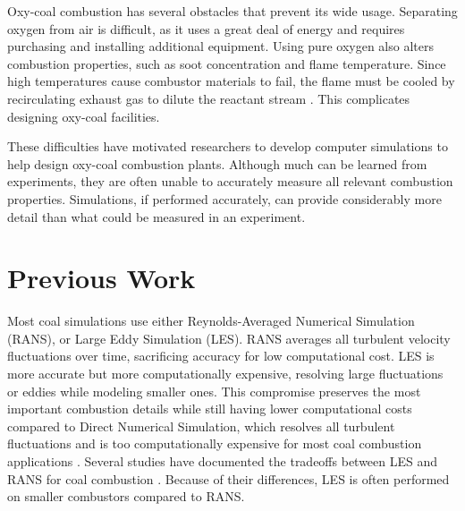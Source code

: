 \documentclass[12pt]{wssci}
\begin{document}
	Oxy-coal combustion has several obstacles that prevent its wide usage.  Separating oxygen from air is difficult, as it uses a great deal of energy and requires purchasing and installing additional equipment.  Using pure oxygen also alters combustion properties, such as soot concentration and flame temperature.  Since high temperatures cause combustor materials to fail, the flame must be cooled by recirculating exhaust gas to dilute the reactant stream \cite{Kather2009}.  This complicates designing oxy-coal facilities. 

	These difficulties have motivated researchers to develop computer simulations to help design oxy-coal combustion plants.  Although much can be learned from experiments, they are often unable to accurately measure all relevant combustion properties.  Simulations, if performed accurately, can provide considerably more detail than what could be measured in an experiment.  
 \section{Previous Work}
	 Most coal simulations use either Reynolds-Averaged Numerical Simulation (RANS), or Large Eddy Simulation (LES).  RANS averages all turbulent velocity fluctuations over time, sacrificing accuracy for low computational cost.  LES is more accurate but more computationally expensive, resolving large fluctuations or eddies while modeling smaller ones.  This compromise preserves the most important combustion details while still having lower computational costs compared to Direct Numerical Simulation, which resolves all turbulent fluctuations and is too computationally expensive for most coal combustion applications \citep{Luo2012}.  Several studies have documented the tradeoffs between LES and RANS  for coal combustion \citep{Yamamoto20111771} \citep{Gharebaghi2011} \citep{Edge2011} \citep{Stein2012} \citep{Warzecha2014732}.  Because of their differences, LES is often performed on smaller combustors compared to RANS.    
	
		
\end{document}
